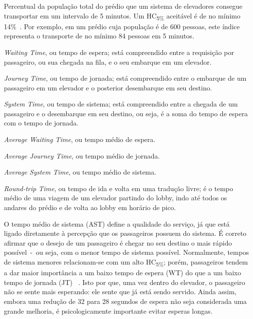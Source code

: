 \begin{description}[leftmargin=!,labelwidth=\widthof{\bfseries HC\textsubscript{5\%}}]
  \item[HC\textsubscript{5\%}]
  Percentual da população total do prédio que um sistema de elevadores consegue
  transportar em um intervalo de 5 minutos. Um HC\textsubscript{5\%} aceitável é
   de no mínimo 14\%~\cite{KOEHLEROTTIGER02}. Por exemplo, em um prédio cuja
   população é de 600 pessoas, este índice representa o transporte de no mínimo
   84 pessoas em 5 minutos.

  \item[WT]
  \textit{Waiting Time}, ou tempo de espera; está compreendido entre a
  requisição por passageiro, ou sua chegada na fila, e o seu embarque em um
  elevador.

  \item[JT]
  \textit{Journey Time}, ou tempo de jornada; está compreendido entre o embarque
   de um passageiro em um elevador e o posterior desembarque em seu destino.

  \item[ST]
  \textit{System Time}, ou tempo de sistema; está compreendido entre a
  chegada de um passageiro e o desembarque em seu destino, ou seja, é a soma do
  tempo de espera com o tempo de jornada.

  \item[AWT]
  \textit{Average Waiting Time}, ou tempo médio de espera.

  \item[AJT]
  \textit{Average Journey Time}, ou tempo médio de jornada.

  \item[AST]
  \textit{Average System Time}, ou tempo médio de sistema.

  \item[RTT]
  \textit{Round-trip Time}, ou tempo de ida e volta em uma tradução livre; é o
  tempo médio de uma viagem de um elevador partindo do lobby, indo até todos os
  andares do prédio e de volta ao lobby em horário de pico.
\end{description}

O tempo médio de sistema (AST) define a qualidade do serviço, já que está ligado
diretamente à percepção que os passageiros possuem do sistema. É correto afirmar
que o desejo de um passageiro é chegar no seu destino o mais rápido
possível~-~ou seja, com o menor tempo de sistema possível. Normalmente, tempos
de sistema menores relacionam-se com um alto HC\textsubscript{5\%}; porém,
passageiros tendem a dar maior importância a um baixo tempo de espera (WT) do
que a um baixo tempo de jornada (JT) ~\cite{KOEHLEROTTIGER02}. Isto por que, uma
vez dentro do elevador, o passageiro não se sente mais esperando: ele sente que
já está sendo servido. Ainda assim, embora uma redução de 32 para 28 segundos de
espera não seja considerada uma grande melhoria, é psicologicamente importante
evitar esperas longas.

